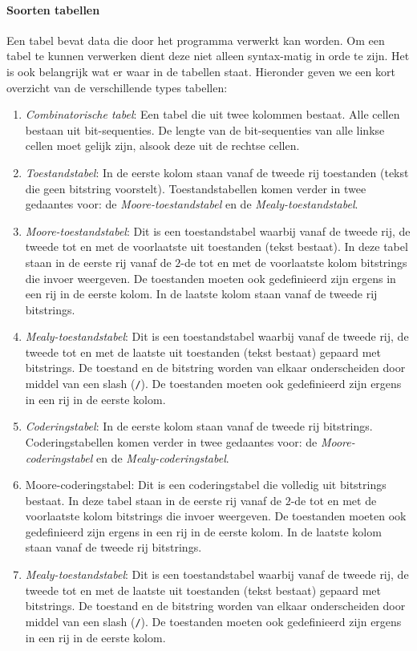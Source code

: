 \paragraph{Soorten tabellen}
Een tabel bevat data die door het programma verwerkt kan worden. Om een tabel te kunnen verwerken dient deze niet alleen syntax-matig in orde te zijn. Het is ook belangrijk wat er waar in de tabellen staat. Hieronder geven we een kort overzicht van de verschillende types tabellen:
\begin{enumerate}
 \item \emph{Combinatorische tabel}: Een tabel die uit twee kolommen bestaat. Alle cellen bestaan uit bit-sequenties. De lengte van de bit-sequenties van alle linkse cellen moet gelijk zijn, alsook deze uit de rechtse cellen.
 \item \emph{Toestandstabel}: In de eerste kolom staan vanaf de tweede rij toestanden (tekst die geen bitstring voorstelt). Toestandstabellen komen verder in twee gedaantes voor: de \emph{Moore-toestandstabel} en de \emph{Mealy-toestandstabel}.
 \item \emph{Moore-toestandstabel}: Dit is een toestandstabel waarbij vanaf de tweede rij, de tweede tot en met de voorlaatste uit toestanden (tekst bestaat). In deze tabel staan in de eerste rij vanaf de $2$-de tot en met de voorlaatste kolom bitstrings die invoer weergeven. De toestanden moeten ook gedefinieerd zijn ergens in een rij in de eerste kolom. In de laatste kolom staan vanaf de tweede rij bitstrings.
 \item \emph{Mealy-toestandstabel}: Dit is een toestandstabel waarbij vanaf de tweede rij, de tweede tot en met de laatste uit toestanden (tekst bestaat) gepaard met bitstrings. De toestand en de bitstring worden van elkaar onderscheiden door middel van een slash (\texttt{/}). De toestanden moeten ook gedefinieerd zijn ergens in een rij in de eerste kolom.
 \item \emph{Coderingstabel}: In de eerste kolom staan vanaf de tweede rij bitstrings. Coderingstabellen komen verder in twee gedaantes voor: de \emph{Moore-coderingstabel} en de \emph{Mealy-coderingstabel}.
 \item{Moore-coderingstabel}: Dit is een coderingstabel die volledig uit bitstrings bestaat. In deze tabel staan in de eerste rij vanaf de $2$-de tot en met de voorlaatste kolom bitstrings die invoer weergeven. De toestanden moeten ook gedefinieerd zijn ergens in een rij in de eerste kolom. In de laatste kolom staan vanaf de tweede rij bitstrings.
 \item \emph{Mealy-toestandstabel}: Dit is een toestandstabel waarbij vanaf de tweede rij, de tweede tot en met de laatste uit toestanden (tekst bestaat) gepaard met bitstrings. De toestand en de bitstring worden van elkaar onderscheiden door middel van een slash (\texttt{/}). De toestanden moeten ook gedefinieerd zijn ergens in een rij in de eerste kolom.
\end{enumerate}
